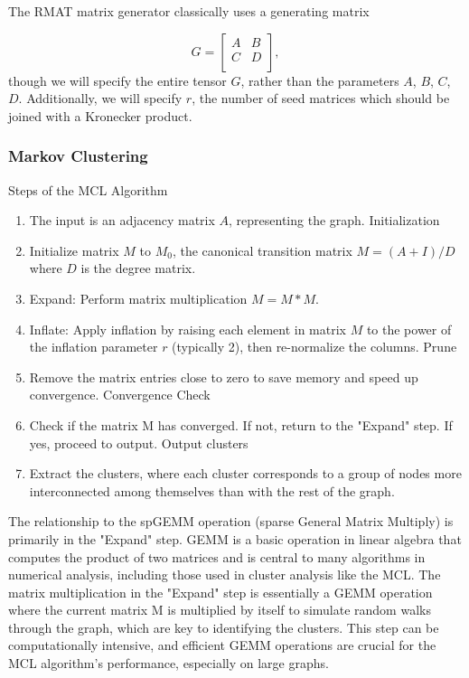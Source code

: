 \documentclass{article}
\newcommand {\hrl}[1]{{\color{cyan}\sf{[Hengrui: #1]}}}
\begin{document}
    The RMAT matrix generator classically uses a generating matrix

	\[
		G = \left[\begin{array}{cc}
			A & B \\
			C & D \\
		\end{array}\right],
	\]
	though we will specify the entire tensor $G$, rather than the parameters
	$A$, $B$, $C$, $D$. Additionally, we will specify $r$, the number of seed
	matrices which should be joined with a Kronecker product.
\subsubsection{Markov Clustering}
Steps of the MCL Algorithm
\begin{enumerate}

\item The input is an adjacency matrix $A$, representing the graph.
Initialization

\item Initialize matrix $M$ to $M_0$, the canonical transition matrix $M = (A + I) / D$ where $D$ is the degree matrix.


\item Expand: Perform matrix multiplication $M = M * M$.


\item Inflate: Apply inflation by raising each element in matrix $M$ to the power of the inflation parameter $r$ (typically 2), then re-normalize the columns.
Prune

\item Remove the matrix entries close to zero to save memory and speed up convergence.
Convergence Check

\item Check if the matrix M has converged. If not, return to the "Expand" step. If yes, proceed to output.
Output clusters

\item Extract the clusters, where each cluster corresponds to a group of nodes more interconnected among themselves than with the rest of the graph.
     
\end{enumerate}
The relationship to the spGEMM operation (sparse General Matrix Multiply) is primarily in the "Expand" step. GEMM is a basic operation in linear algebra that computes the product of two matrices and is central to many algorithms in numerical analysis, including those used in cluster analysis like the MCL. The matrix multiplication in the "Expand" step is essentially a GEMM operation where the current matrix M is multiplied by itself to simulate random walks through the graph, which are key to identifying the clusters. This step can be computationally intensive, and efficient GEMM operations are crucial for the MCL algorithm's performance, especially on large graphs.
\end{document}
